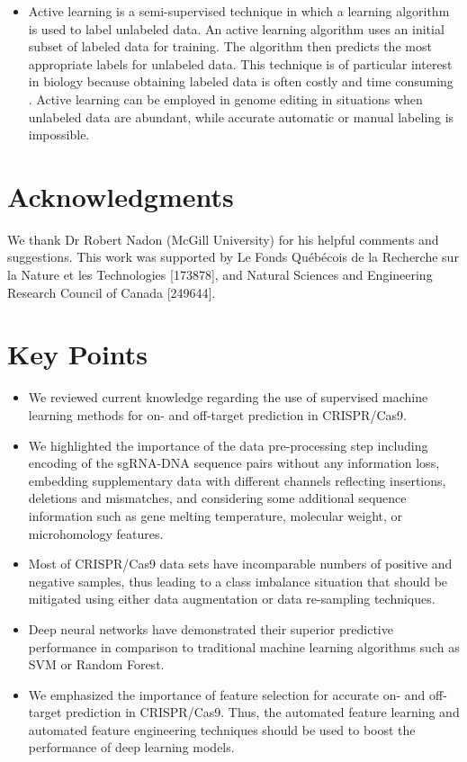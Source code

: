 \documentclass[unnumsec,webpdf,contemporary,large]{oup-authoring-template}
\theoremstyle{thmstyleone}%
\theoremstyle{thmstyletwo}%
\theoremstyle{thmstylethree}%
\begin{document}
\begin{itemize}
\item Active learning is a semi-supervised technique in which a learning algorithm is used to label unlabeled data. An active learning algorithm uses an initial subset of labeled data for training. The algorithm then predicts the most appropriate labels for unlabeled data. This technique is of particular interest in biology because obtaining labeled data is often costly and time consuming \cite{gordon2018meta, lee2019learning, nguyen2020uncertainty}. Active learning can be employed in genome editing in situations when unlabeled data are abundant, while accurate automatic or manual labeling is impossible.
\end{itemize}


\section{Acknowledgments}
We thank Dr Robert Nadon (McGill University) for his helpful comments and suggestions. This work was supported by Le Fonds Québécois de la Recherche sur la Nature et les Technologies [173878], and Natural Sciences and Engineering Research Council of Canada [249644].

\section{Key Points}

\begin{itemize}
  \item We reviewed current knowledge regarding the use of supervised machine learning methods for on- and off-target prediction in CRISPR/Cas9.
  \item We highlighted the importance of the data pre-processing step including encoding of the sgRNA-DNA sequence pairs without any information loss, embedding supplementary data with different channels reflecting insertions, deletions and mismatches, and considering some additional sequence information such as gene melting temperature, molecular weight, or microhomology features.
  \item Most of CRISPR/Cas9 data sets have incomparable numbers of positive and negative samples, thus leading to a class imbalance situation that should be mitigated using either data augmentation or data re-sampling techniques.
  \item Deep neural networks have demonstrated their superior predictive performance in comparison to traditional machine learning algorithms such as SVM or Random Forest.
  \item We emphasized the importance of feature selection for accurate on- and off-target prediction in CRISPR/Cas9. Thus, the automated feature learning and automated feature engineering techniques should be used to boost the performance of deep learning models.
\end{itemize}
\end{document}
